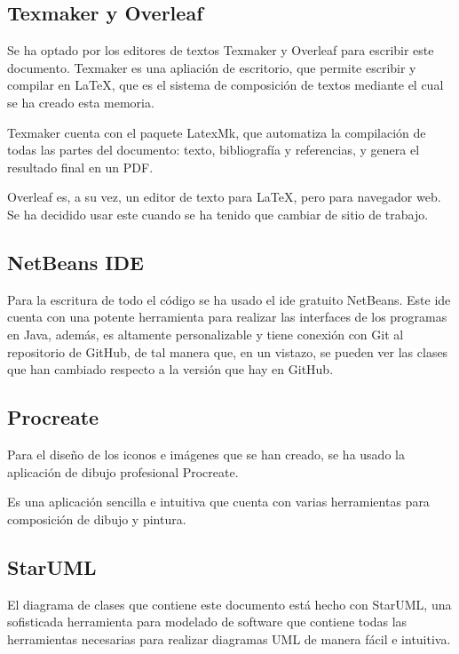 \subsection{Texmaker y Overleaf}
Se ha optado por los editores de textos Texmaker y Overleaf para escribir este documento. Texmaker es una apliación de escritorio, que permite escribir y compilar en \LaTeX{}, que es el sistema de composición de textos mediante el cual se ha creado esta memoria.

Texmaker\cite{texmaker} cuenta con el paquete LatexMk, que automatiza la compilación de todas las partes del documento: texto, bibliografía y referencias, y genera el resultado final en un PDF.

Overleaf\cite{overleaf} es, a su vez, un editor de texto para \LaTeX{}, pero para navegador web. Se ha decidido usar este cuando se ha tenido que cambiar de sitio de trabajo.

\subsection{NetBeans IDE}
Para la escritura de todo el código se ha usado el \gls{ide} gratuito NetBeans\cite{netbeans}.
Este \gls{ide} cuenta con una potente herramienta para realizar las interfaces de los programas en Java, además, es altamente personalizable y tiene conexión con Git al repositorio de GitHub, de tal manera que, en un vistazo, se pueden ver las clases que han cambiado respecto a la versión que hay en GitHub.


\subsection{Procreate}
\label{sub:procreate}
Para el diseño de los iconos e imágenes que se han creado, se ha usado la aplicación de dibujo profesional Procreate\cite{procreate}.

Es una aplicación sencilla e intuitiva que cuenta con varias herramientas para composición de dibujo y pintura.

\subsection{StarUML}
\label{sub:staruml}
El diagrama de clases que contiene este documento está hecho con StarUML\cite{staruml}, una sofisticada herramienta para modelado de software que contiene todas las herramientas necesarias para realizar diagramas UML de manera fácil e intuitiva.

